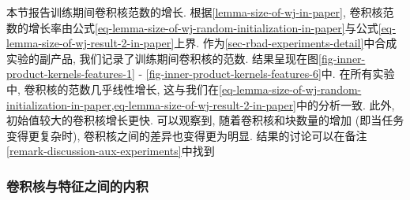 
本节报告训练期间卷积核范数的增长. 
根据\cref{lemma-size-of-wj-in-paper}, 卷积核范数的增长率由公式\cref{eq-lemma-size-of-wj-random-initialization-in-paper}与公式\cref{eq-lemma-size-of-wj-result-2-in-paper}上界.
作为\cref{sec-rbad-experiments-detail}中合成实验的副产品, 我们记录了训练期间卷积核的范数.
结果呈现在图\cref{fig-inner-product-kernels-features-1} - \cref{fig-inner-product-kernels-features-6}中.
在所有实验中, 卷积核的范数几乎线性增长, 这与我们在\cref{eq-lemma-size-of-wj-random-initialization-in-paper,eq-lemma-size-of-wj-result-2-in-paper}中的分析一致. 
此外, 初始值较大的卷积核增长更快. 
可以观察到, 随着卷积核和块数量的增加 (即当任务变得更复杂时), 卷积核之间的差异也变得更为明显.
结果的讨论可以在备注\cref{remark-discussion-aux-experiments}中找到

\subsubsection{卷积核与特征之间的内积}\label{sec-inner-product-experiments}

